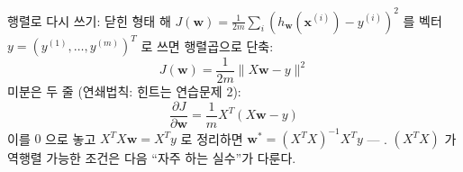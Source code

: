 \begin{frame}{행렬로 다시 쓰기: 닫힌 형태 해}
  $J(\boldsymbol{w}) = \frac{1}{2m}\sum_i (h_{\boldsymbol{w}}(\boldsymbol{x}^{(i)}) - y^{(i)})^2$ 를 벡터
  $y = (y^{(1)}, \ldots, y^{(m)})^T$ 로 쓰면 행렬곱으로 단축:
  \[
  J(\boldsymbol{w}) = \frac{1}{2m} \|X\boldsymbol{w} - y\|^2
  \]
  미분은 두 줄 (연쇄법칙: 힌트는 연습문제 2):
  \[
  \frac{\partial J}{\partial \boldsymbol{w}} = \frac{1}{m} X^T(X\boldsymbol{w} - y)
  \]
  이를 $0$ 으로 놓고 $X^TX\boldsymbol{w} = X^Ty$ 로 정리하면
  $\boldsymbol{w}^{*} = (X^TX)^{-1}X^Ty$ --- .
  $(X^TX)$ 가 역행렬 가능한 조건은 다음 ``자주 하는 실수''가 다룬다.
\end{frame}
